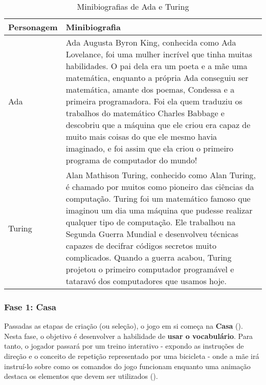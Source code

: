 \begin{table}[H]
\centering
\caption{Minibiografias de Ada e Turing}
\label{tab:minibiografias}
\begin{tabular}{|l|p{12cm}|}
\hline
\textbf{Personagem} & \textbf{Minibiografia}                                                                                                                                                                                                                                                                                                                                                                                                                                                                                                \\ \hline
Ada                 & Ada Augusta Byron King, conhecida como Ada Lovelance, foi uma mulher incrível que tinha muitas habilidades. O pai dela era um poeta e a mãe uma matemática, enquanto a própria Ada conseguiu ser matemática, amante dos poemas, Condessa e a primeira programadora. Foi ela quem traduziu os trabalhos do matemático Charles Babbage e descobriu que a máquina que ele criou era capaz de muito mais coisas do que ele mesmo havia imaginado, e foi assim que ela criou o primeiro programa de computador do mundo! \\ \hline
Turing              & Alan Mathison Turing, conhecido como Alan Turing, é chamado por muitos como pioneiro das ciências da computação. Turing foi um matemático famoso que imaginou um dia uma máquina que pudesse realizar qualquer tipo de computação. Ele trabalhou na Segunda Guerra Mundial e desenvolveu técnicas capazes de decifrar códigos secretos muito complicados. Quando a guerra acabou, Turing projetou o primeiro computador programável e tataravó dos computadores que usamos hoje.                                    \\ \hline
\end{tabular}
\end{table}

\subsubsection{Fase 1: Casa} \label{sssec:fase_1}

Passadas as etapas de criação (ou seleção), o jogo em si começa na \textbf{Casa} (). Nesta fase, o objetivo é desenvolver a habilidade de \textbf{usar o vocabulário}. Para tanto, o jogador passará por um treino interativo - expondo as instruções de direção e o conceito de repetição representado por uma bicicleta - onde a mãe irá instruí-lo sobre como os comandos do jogo funcionam enquanto uma animação destaca os elementos que devem ser utilizados (). 

